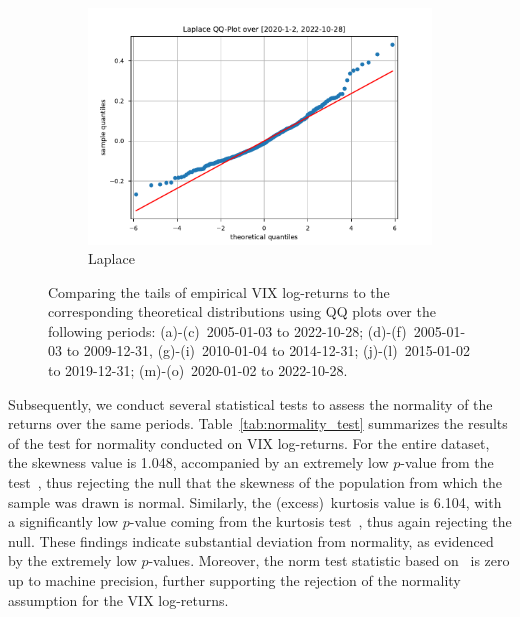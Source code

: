 \begin{figure}[htbp]
\begin{subfigure}[b]{0.32\textwidth}
        \includegraphics[width=\textwidth]{content/reschap4/Figures/laplace_QQ_2020-1-2-2022-10-28.pdf}
        \caption{Laplace}
    \end{subfigure}
    \caption{Comparing the tails of empirical VIX log-returns to the corresponding theoretical distributions using QQ plots over the following periods: (a)-(c)~{2005-01-03} to {2022-10-28}; (d)-(f)~{2005-01-03} to {2009-12-31}, (g)-(i)~{2010-01-04} to {2014-12-31}; (j)-(l)~{2015-01-02} to {2019-12-31}; (m)-(o)~{2020-01-02} to {2022-10-28}.}\label{fig:QQplots}
\end{figure}

Subsequently, we conduct several statistical tests to assess the normality of the returns over the same periods. Table~\ref{tab:normality_test} summarizes the results of the test for normality conducted on VIX log-returns. For the entire dataset, the skewness value is 1.048, accompanied by an extremely low {$p$\nobreakdash-value} from the test~\cite{DAgostino1990ANormality}, thus rejecting the null that the skewness of the population from which the sample was drawn is normal. Similarly, the (excess)~kurtosis value is 6.104, with a significantly low {$p$\nobreakdash-value} coming from the kurtosis test~\cite{Anscombe1983DistributionSamples}, thus again rejecting the null. These findings indicate substantial deviation from normality, as evidenced by the extremely low {$p$\nobreakdash-values}. Moreover, the norm test statistic based on~\cite{DAgostino1971AnSamples, DAgostino1973Testssqrtb_1} is zero up to machine precision, further supporting the rejection of the normality assumption for the VIX log-returns.

